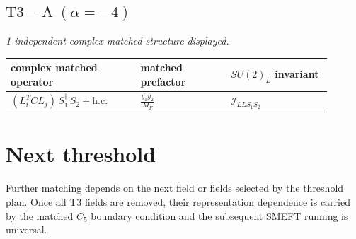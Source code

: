\documentclass[9pt]{article}
\begin{document}
\subsection*{$ \mathrm{T3-A}\;(\alpha=-4) $}
\textit{1 independent complex matched structure displayed. }
\begin{longtable}{@{}p{0.36\linewidth}p{0.25\linewidth}p{0.29\linewidth}@{}}
\toprule
complex matched operator & matched prefactor & $SU(2)_L$ invariant \\
\midrule
$ (L_i^T C L_j)\,S_1^\dagger\,S_2+\mathrm{h.c.} $ & $ \frac{\overline{y_{1}} \overline{y_{2}}}{M_F} $ & $ \mathcal{I}_{LLS_1S_2} $ \\
\bottomrule
\end{longtable}
\section*{Next threshold}
Further matching depends on the next field or fields selected by the threshold plan.  Once all T3 fields are removed, their representation dependence is carried by the matched $C_5$ boundary condition and the subsequent SMEFT running is universal.
\end{document}

